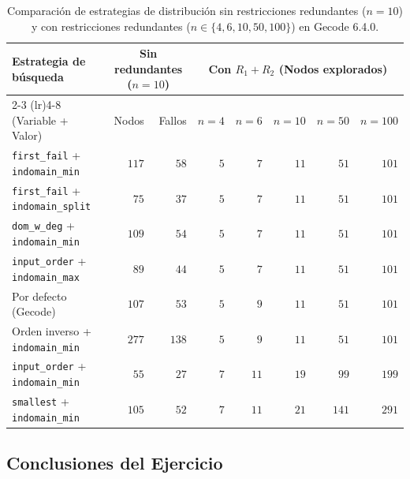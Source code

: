 \begin{table}[htbp]
    \centering
    \small
    \setlength{\tabcolsep}{4.0pt}
    \begin{tabular}{lrrrrrrr}
        \toprule
        Estrategia de búsqueda & \multicolumn{2}{c}{Sin redundantes ($n=10$)} & \multicolumn{5}{c}{Con $R_1 + R_2$ (Nodos explorados)} \\
        \cmidrule(lr){2-3} \cmidrule(lr){4-8}
        (Variable + Valor) & Nodos & Fallos & $n=4$ & $n=6$ & $n=10$ & $n=50$ & $n=100$ \\
        \midrule
        \texttt{first\_fail} + \texttt{indomain\_min}   & $117$ & $58$  & $5$ & $7$  & $11$ & $51$  & $101$ \\
        \texttt{first\_fail} + \texttt{indomain\_split} & $75$  & $37$  & $5$ & $7$  & $11$ & $51$  & $101$ \\
        \texttt{dom\_w\_deg} + \texttt{indomain\_min}   & $109$ & $54$  & $5$ & $7$  & $11$ & $51$  & $101$ \\
        \texttt{input\_order} + \texttt{indomain\_max}  & $89$  & $44$  & $5$ & $7$  & $11$ & $51$  & $101$ \\
        Por defecto (Gecode)                            & $107$ & $53$  & $5$ & $9$  & $11$ & $51$  & $101$ \\
        Orden inverso + \texttt{indomain\_min}          & $277$ & $138$ & $5$ & $9$  & $11$ & $51$  & $101$ \\
        \texttt{input\_order} + \texttt{indomain\_min}  & $55$  & $27$  & $7$ & $11$ & $19$ & $99$  & $199$ \\
        \texttt{smallest} + \texttt{indomain\_min}      & $105$ & $52$  & $7$ & $11$ & $21$ & $141$ & $291$ \\
        \bottomrule
    \end{tabular}
    \caption{Comparación de estrategias de distribución sin restricciones redundantes ($n=10$) y con restricciones redundantes ($n \in \{4, 6, 10, 50, 100\}$) en Gecode 6.4.0.}
    \label{tab:secuencia_estrategias_tab}
\end{table}

\clearpage
\subsection{Conclusiones del Ejercicio}

